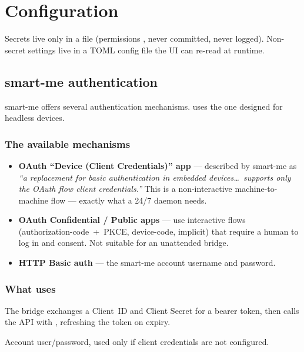 \chapter{Configuration}
\label{ch:config}

Secrets live only in a  file (permissions , never committed, never
logged). Non-secret settings live in a TOML config file the UI can re-read at runtime.

\section{smart-me authentication}
\label{sec:smartme-auth}

smart-me offers several authentication mechanisms. \prog uses the one designed for
headless devices.

\subsection{The available mechanisms}
\begin{itemize}
  \item \textbf{OAuth “Device (Client Credentials)” app} — described by smart-me as
        \emph{“a replacement for basic authentication in embedded devices\dots\ supports
        only the OAuth flow client credentials.”} This is a non-interactive
        machine-to-machine flow — exactly what a 24/7 daemon needs.
  \item \textbf{OAuth Confidential / Public apps} — use interactive flows
        (authorization-code~+~PKCE, device-code, implicit) that require a human to log in
        and consent. Not suitable for an unattended bridge.
  \item \textbf{HTTP Basic auth} — the smart-me account username and password.
\end{itemize}

\subsection{What \prog uses}
\begin{description}[style=nextline]
  \item[Primary — OAuth2 Client Credentials] The bridge exchanges a Client~ID and Client
        Secret for a bearer token, then calls the API with
        , refreshing the token on expiry.
  \item[Fallback — HTTP Basic] Account user/password, used only if client credentials are
        not configured.
\end{description}

